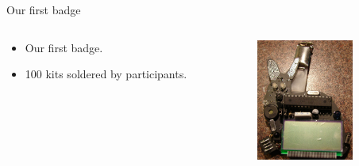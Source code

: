 \documentclass{beamer}
\begin{document}
\begin{frame}{Our first badge}
  \begin{columns}
    \begin{column}{6cm}
        \begin{itemize}
	    \item Our first badge.
	    \item 100 kits soldered by participants.
	\end{itemize}
    \end{column}
    \begin{column}{6cm}
        \includegraphics[height=4cm]{bilder/ehaserl.jpg}\\
    \end{column}
  \end{columns}
  \end{frame}
\end{document}
